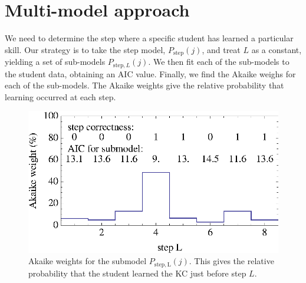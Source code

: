 \documentclass{acmlarge-edm}
\begin{document}
\section{Multi-model approach}
\label{multi-model}

We need to determine the step where a specific student has learned a
particular skill.  Our strategy is to take the step model, 
$P_\mathrm{step}(j)$, and treat $L$ as a constant, yielding a set of 
sub-models $P_{\mathrm{step},L}(j)$.
We then fit each of the sub-models to the student data, obtaining an
AIC value.  Finally, we find the Akaike weighs for each of the
sub-models.  The Akaike weights give the relative probability that learning
occurred at each step.

\begin{figure}
  \centering \includegraphics{step-weights.eps}
   \caption{Akaike weights for the submodel $P_\mathrm{step,L}(j)$.  
     This gives the relative probability that
      the student learned the KC just before step $L$.}
    \label{step-weights}
\end{figure}
\end{document}
